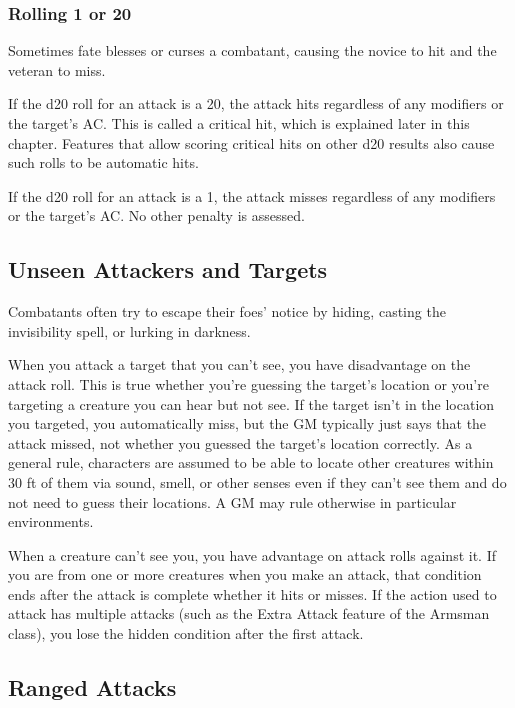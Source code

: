\subsubsection{Rolling 1 or 20}

Sometimes fate blesses or curses a combatant, causing the novice to hit and the veteran to miss.

If the d20 roll for an attack is a 20, the attack hits regardless of any modifiers or the target's AC. This is called a critical hit, which is explained later in this chapter. Features that allow scoring critical hits on other d20 results also cause such rolls to be automatic hits.

If the d20 roll for an attack is a 1, the attack misses regardless of any modifiers or the target's AC. No other penalty is assessed.

\subsection{Unseen Attackers and Targets}\label{subsec:unseen-attackers}

Combatants often try to escape their foes' notice by hiding, casting the invisibility spell, or lurking in darkness.

When you attack a target that you can't see, you have disadvantage on the attack roll. This is true whether you're guessing the target's location or you're targeting a creature you can hear but not see. If the target isn't in the location you targeted, you automatically miss, but the GM typically just says that the attack missed, not whether you guessed the target's location correctly. As a general rule, characters are assumed to be able to locate other creatures within 30 ft of them via sound, smell, or other senses even if they can't see them and do not need to guess their locations. A GM may rule otherwise in particular environments.

When a creature can't see you, you have advantage on attack rolls against it. If you are  from one or more creatures when you make an attack, that condition ends after the attack is complete whether it hits or misses. If the action used to attack has multiple attacks (such as the Extra Attack feature of the Armsman class), you lose the hidden condition after the first attack.

\subsection{Ranged Attacks}

